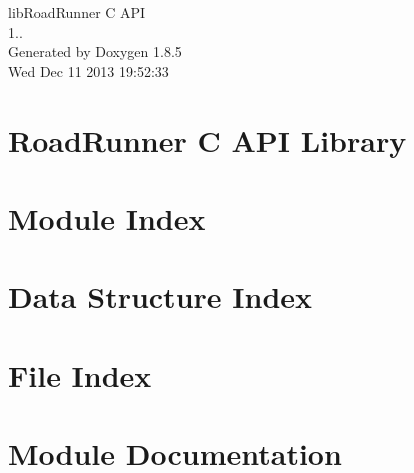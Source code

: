 \documentclass[twoside]{book}
\newcommand{\clearemptydoublepage}{%
  \newpage{\pagestyle{empty}\cleardoublepage}%
}
\begin{document}
\hypersetup{pageanchor=false}
\begin{titlepage}
\vspace*{7cm}
\begin{center}%
{\Large lib\-Road\-Runner C A\-P\-I \\[1ex]\large 1.. }\\
\vspace*{1cm}
{\large Generated by Doxygen 1.8.5}\\
\vspace*{0.5cm}
{\small Wed Dec 11 2013 19:52:33}\\
\end{center}
\end{titlepage}
\clearemptydoublepage
\tableofcontents
\clearemptydoublepage
{}
\hypersetup{pageanchor=true}

\chapter{Road\-Runner C A\-P\-I Library}
\label{index}\hypertarget{index}{}
\chapter{Module Index}

\chapter{Data Structure Index}

\chapter{File Index}

\chapter{Module Documentation}
























\end{document}
